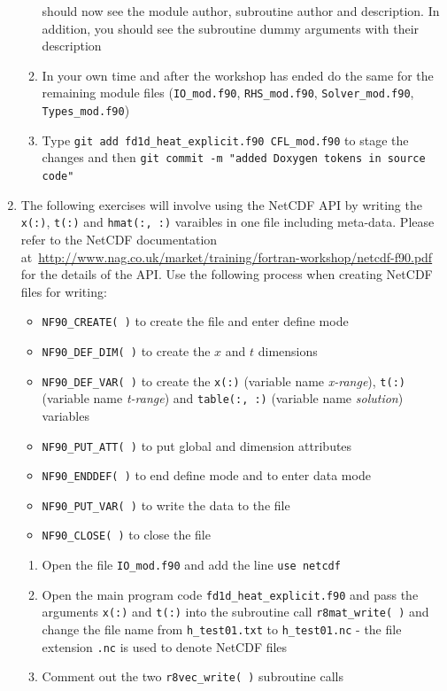 \documentclass[12pt]{article}
\begin{document}
\begin{enumerate}
\begin{enumerate}
should now see the module author, subroutine author and description. In addition, you should see the subroutine
dummy arguments with their description
\item In your own time and after the workshop has ended do the same for the remaining module files 
(\texttt{IO\_mod.f90}, \texttt{RHS\_mod.f90}, \texttt{Solver\_mod.f90}, \texttt{Types\_mod.f90})
\item Type \texttt{git add fd1d\_heat\_explicit.f90 CFL\_mod.f90} to stage the changes and then 
\texttt{git commit -m "added Doxygen tokens in source code"}
\end{enumerate}
\item The following exercises will involve using the NetCDF API by writing the
  \texttt{x(:)}, \texttt{t(:)} and \texttt{hmat(:, :)} varaibles in one file including meta-data. 
Please refer to the NetCDF documentation at~\url{http://www.nag.co.uk/market/training/fortran-workshop/netcdf-f90.pdf} 
for the details of the API. Use the following process when creating NetCDF files for writing:
\begin{itemize}
\item\texttt{NF90\_CREATE( )} to create the file and enter define mode
\item\texttt{NF90\_DEF\_DIM( )} to create the $x$ and $t$ dimensions
\item\texttt{NF90\_DEF\_VAR( )} to create the \texttt{x(:)} (variable name {\em x-range}), \texttt{t(:)} (variable name
  {\em t-range}) and \texttt{table(:, :)} (variable name {\em solution}) variables
\item\texttt{NF90\_PUT\_ATT( )} to put global and dimension attributes
\item\texttt{NF90\_ENDDEF( )} to end define mode and to enter data mode
\item\texttt{NF90\_PUT\_VAR( )} to write the data to the file
\item\texttt{NF90\_CLOSE( )} to close the file
\end{itemize}
\begin{enumerate}
\item Open the file \texttt{IO\_mod.f90} and add the line \texttt{use netcdf}
\item Open the main program code \texttt{fd1d\_heat\_explicit.f90} and pass the arguments \texttt{x(:)} and
  \texttt{t(:)} into the subroutine call \texttt{r8mat\_write( )} and change the file name from \texttt{h\_test01.txt}
  to \texttt{h\_test01.nc} - the file extension \texttt{.nc} is used to denote NetCDF files
\item Comment out the two \texttt{r8vec\_write( )} subroutine calls

\end{enumerate}
\end{enumerate}
\end{document}
